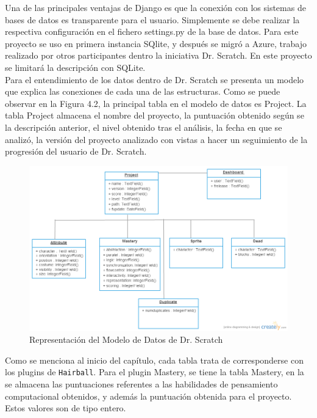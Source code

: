 \documentclass[a4paper, 12pt]{book}
\begin{document}
Una de las principales ventajas de Django es que la conexión con los sistemas de bases
de datos es transparente para el usuario. Simplemente se debe realizar la respectiva 
configuración en el fichero settings.py de la base de datos. Para este proyecto se uso
en primera instancia SQlite, y después se migró a Azure, trabajo realizado por otros 
participantes dentro la iniciativa Dr. Scratch. En este proyecto se limitará la 
descripción con SQLite. \\  
 
Para el entendimiento de los datos dentro de Dr. Scratch se presenta un modelo que 
explica las conexiones de cada una de las estructuras. Como se puede observar en la 
Figura 4.2, la principal tabla en el modelo de datos es Project. La tabla Project 
almacena el nombre del proyecto, la puntuación obtenido según se la descripción 
anterior, el nivel obtenido tras el análisis, la fecha en que se analizó, la versión 
del proyecto analizado con vistas a hacer un seguimiento de la progresión del 
usuario de Dr. Scratch. \\

 \begin{figure}
    \centering
		\graphicspath{{img/}}
    \includegraphics[bb=0 0 800 600, width=12cm, keepaspectratio]{modelo.png}
    \caption{Representación del Modelo de Datos de Dr. Scratch}
    \label{figura:foro_hilos}
 \end{figure}



Como se menciona al inicio del capítulo, cada tabla trata de corresponderse con los
plugins de \texttt{Hairball}. Para el plugin Mastery, se tiene la tabla Mastery, en
la se almacena las puntuaciones referentes a las habilidades de pensamiento 
computacional obtenidos, y además la puntuación obtenida para el proyecto. Estos 
valores son de tipo entero. \\
\end{document}
